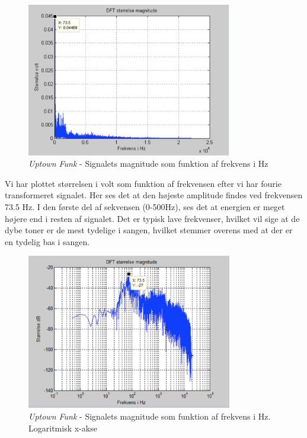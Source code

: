 \begin{figure}[H]
	\centering
	\includegraphics[width=0.8\textwidth]{Figurer/UptownFunk2}
	\caption{\textit{Uptown Funk} - Signalets magnitude som funktion af frekvens i Hz}
\end{figure}

Vi har plottet størrelsen i volt som funktion af frekvensen efter vi har fourie transformeret signalet. Her ses det at den højeste amplitude findes ved frekvensen 73.5 Hz. I den første del af sekvensen (0-500Hz), ses det at energien er meget højere end i resten af signalet. Det er typisk lave frekvenser, hvilket vil sige at de dybe toner er de mest tydelige i sangen, hvilket stemmer overens med at der er en tydelig bas i sangen.  

\begin{figure}[H]
	\centering
	\includegraphics[width=0.8\textwidth]{Figurer/UptownFunk3}
	\caption{\textit{Uptown Funk} - Signalets magnitude som funktion af frekvens i Hz. Logaritmisk x-akse}
\end{figure}

